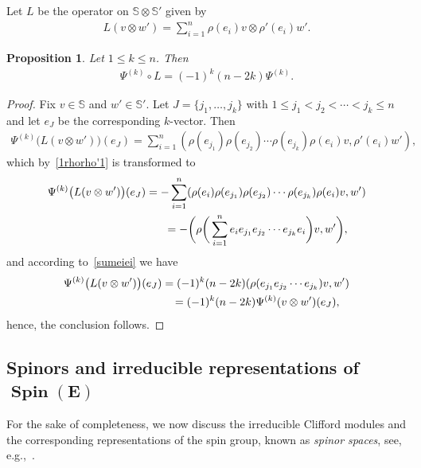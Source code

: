 \documentclass[pdftex]{sigma}
\DeclareMathOperator{\Spin}{Spin}
\numberwithin{equation}{section}
\newtheorem{prop}[theor]{Proposition}
\begin{document}
Let $L$ be the operator on $\mathbb S \otimes \mathbb S' $ given by
\begin{gather*}
L(v\otimes w')= \sum_{i=1}^n \rho(e_i)v\otimes \rho'(e_i)w' .
\end{gather*}

\begin{prop} Let $1\leq k\leq n$. Then
\begin{gather}\label{rhorho'3}
\Psi^{(k)} \circ L = (-1)^k (n-2k) \Psi^{(k)} .
\end{gather}
\end{prop}

\begin{proof}
Fix $v\in \mathbb S$ and $w'\in \mathbb S'$. Let $J=\{j_1,\ldots, j_k \}$ with $1\leq j_1<j_2<\cdots <j_k\leq n$ and let $e_J$ be the corresponding $k$-vector.
Then
\begin{gather*}
\Psi^{(k)} \big(L(v\otimes w')\big) (e_J) = \sum_{i=1}^n (\rho(e_{j_1}) \rho(e_{j_2}) \cdots \rho(e_{j_k}) \rho(e_i)v, \rho'(e_i)w'),
\end{gather*}
which by~\eqref{1rhorho'1} is transformed to
\begin{gather*}
\Psi^{(k)} \big(L(v\otimes w')\big) (e_J)=- \sum_{i=1}^n (\rho(e_i) \rho(e_{j_1}) \rho(e_{j_2}) \cdots \rho(e_{j_k}) \rho(e_i)v,w')
\\ \hphantom{\Psi^{(k)} \big(L(v\otimes w')\big) (e_J)}
{}= -\bigg(\rho\bigg(\sum_{i=1}^n e_ie_{j_1} e_{j_2} \cdots e_{j_k} e_i\bigg) v,w'\bigg),
\end{gather*}
and according to~\eqref{sumeiei} we have
\begin{gather*}
\Psi^{(k)} \big(L(v\otimes w')\big) (e_J) = (-1)^k(n-2k) (\rho(e_{j_1} e_{j_2} \cdots e_{j_k}) v,w')
\\ \hphantom{\Psi^{(k)} \big(L(v\otimes w')\big) (e_J)}
{}= (-1)^k (n-2k) \Psi^{(k)}(v\otimes w')(e_J),
\end{gather*}
hence, the conclusion follows.
\end{proof}

\subsection[Spinors and irreducible representations of Spin(E)]
{Spinors and irreducible representations of $\boldsymbol{\Spin(E)}$}

For the sake of completeness, we now discuss the irreducible Clifford modules and the corresponding representations of the spin group, known as \emph{spinor spaces}, see, e.g.,~\cite{dss, deligne, kn}.
\end{document}
